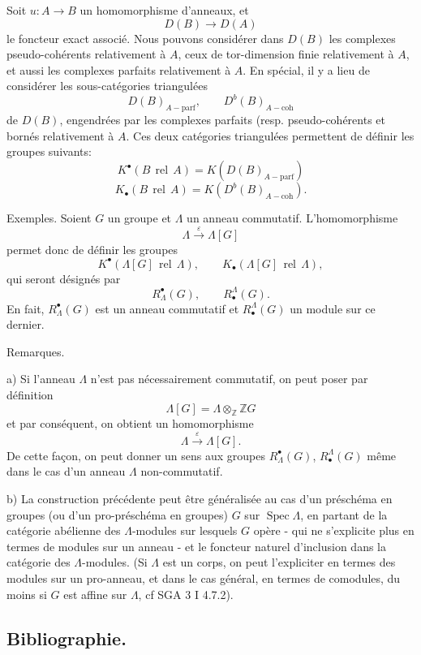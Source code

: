 \documentclass[11pt]{article}
\DeclareMathOperator{\Spec}{Spec}
\providecommand{\parf}{\mathrm{parf}}
\providecommand{\coh}{\mathrm{coh}}
\providecommand{\Spec}{\operatorname{Spec}}
\providecommand{\Spec}{\operatorname{Spec}}
\providecommand{\parf}{\mathrm{parf}}
\providecommand{\coh}{\mathrm{coh}}
\providecommand{\Spec}{\operatorname{Spec}}
\providecommand{\Spec}{\operatorname{Spec}}
\begin{document}
Soit $u:A\to B$ un homomorphisme d'anneaux, et
\[
D(B)\longrightarrow D(A)
\]
le foncteur exact associé. Nous pouvons considérer dans $D(B)$ les complexes pseudo-cohérents relativement à $A$, ceux de tor-dimension finie relativement à $A$, et aussi les complexes parfaits relativement à $A$. En spécial, il y a lieu de considérer les sous-catégories triangulées
\[
D(B)_{A-\parf},\qquad D^b(B)_{A-\coh}
\]
de $D(B)$, engendrées par les complexes parfaits (resp. pseudo-cohérents et bornés relativement à $A$. Ces deux catégories triangulées permettent de définir les groupes suivants:
\[
K^{\bullet}(B\operatorname{\,rel\,}A)=K(D(B)_{A-\parf})
\]
\[
K_\bullet(B\operatorname{\,rel\,}A)=K(D^b(B)_{A-\coh}).
\]

Exemples. Soient $G$ un groupe et $\Lambda$ un anneau commutatif. L'homomorphisme
\[
\Lambda\xrightarrow{\varepsilon}\Lambda[G]
\]
permet donc de définir les groupes
\[
K^{\bullet}(\Lambda[G]\operatorname{\,rel\,}\Lambda),\qquad
K_\bullet(\Lambda[G]\operatorname{\,rel\,}\Lambda),
\]
qui seront désignés par
\[
R^{\bullet}_\Lambda(G),\qquad R^\Lambda_\bullet(G).
\]
En fait, $R^{\bullet}_\Lambda(G)$ est un anneau commutatif et $R^\Lambda_\bullet(G)$ un module sur ce dernier.

Remarques.

a) Si l'anneau $\Lambda$ n'est pas nécessairement commutatif, on peut poser par définition
\[
\Lambda[G]=\Lambda\otimes_{\mathbb Z}\mathbb ZG
\]
et par conséquent, on obtient un homomorphisme
\[
\Lambda\xrightarrow{\varepsilon}\Lambda[G].
\]
De cette façon, on peut donner un sens aux groupes $R^{\bullet}_\Lambda(G)$, $R^\Lambda_\bullet(G)$ même dans le cas d'un anneau $\Lambda$ non-commutatif.

b) La construction précédente peut être généralisée au cas d'un préschéma en groupes (ou d'un pro-préschéma en groupes) $G$ sur $\Spec\Lambda$, en partant de la catégorie abélienne des $\Lambda$-modules sur lesquels $G$ opère - qui ne s'explicite plus en termes de modules sur un anneau - et le foncteur naturel d'inclusion dans la catégorie des $\Lambda$-modules. (Si $\Lambda$ est un corps, on peut l'expliciter en termes des modules sur un pro-anneau, et dans le cas général, en termes de comodules, du moins si $G$ est affine sur $\Lambda$, cf SGA 3 I 4.7.2).

\subsection*{Bibliographie.}
\end{document}

